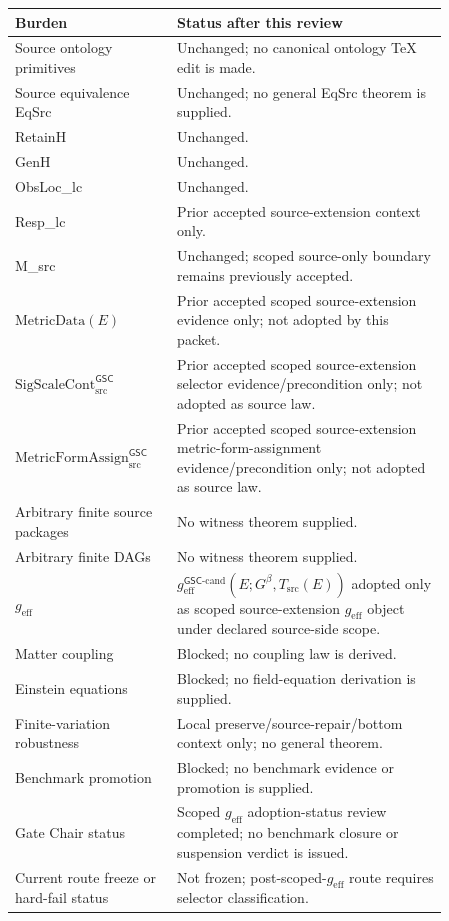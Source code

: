 \documentclass[11pt]{article}
\newcommand{\Gbeta}{G^\beta}
\newcommand{\SigScaleCont}{\mathrm{SigScaleCont}^{\mathsf{GSC}}_{\mathrm{src}}}
\newcommand{\MetricFormAssign}{\mathrm{MetricFormAssign}^{\mathsf{GSC}}_{\mathrm{src}}}
\newcommand{\geff}{g_{\mathrm{eff}}}
\newcommand{\geffCand}{g_{\mathrm{eff}}^{\mathsf{GSC}\mbox{-}\mathrm{cand}}}
\begin{document}
\begin{longtable}{p{0.30\linewidth}p{0.56\linewidth}}
\toprule
Burden & Status after this review \\
\midrule
Source ontology primitives & Unchanged; no canonical ontology TeX edit is made. \\
Source equivalence EqSrc & Unchanged; no general EqSrc theorem is supplied. \\
RetainH & Unchanged. \\
GenH & Unchanged. \\
ObsLoc\_lc & Unchanged. \\
Resp\_lc & Prior accepted source-extension context only. \\
M\_src & Unchanged; scoped source-only boundary remains previously accepted. \\
\(\mathrm{MetricData}(E)\) & Prior accepted scoped source-extension evidence only; not adopted by this packet. \\
\(\SigScaleCont\) & Prior accepted scoped source-extension selector evidence/precondition only; not adopted as source law. \\
\(\MetricFormAssign\) & Prior accepted scoped source-extension metric-form-assignment evidence/precondition only; not adopted as source law. \\
Arbitrary finite source packages & No witness theorem supplied. \\
Arbitrary finite DAGs & No witness theorem supplied. \\
\(\geff\) & \(\geffCand(E;\Gbeta,T_{\mathrm{src}}(E))\) adopted only as scoped source-extension \(\geff\) object under declared source-side scope. \\
Matter coupling & Blocked; no coupling law is derived. \\
Einstein equations & Blocked; no field-equation derivation is supplied. \\
Finite-variation robustness & Local preserve/source-repair/bottom context only; no general theorem. \\
Benchmark promotion & Blocked; no benchmark evidence or promotion is supplied. \\
Gate Chair status & Scoped \(\geff\) adoption-status review completed; no benchmark closure or suspension verdict is issued. \\
Current route freeze or hard-fail status & Not frozen; post-scoped-\(\geff\) route requires selector classification. \\
\bottomrule
\end{longtable}
\end{document}
